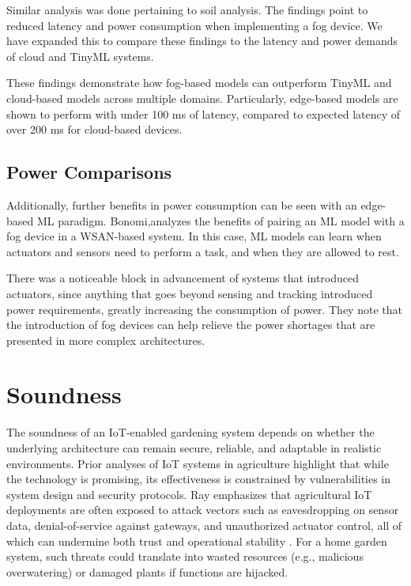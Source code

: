 \documentclass{sigchi}
\begin{document}
Similar analysis was done pertaining to soil analysis. The findings point to reduced latency and power consumption when implementing a fog device. We have expanded this to compare these findings to the latency and power demands of cloud and TinyML systems.

These findings demonstrate how fog-based models can outperform TinyML and cloud-based models across multiple domains. Particularly, edge-based models are shown to perform with under 100 ms of latency, compared to expected latency of over 200 ms for cloud-based devices.

\subsection{Power Comparisons}

Additionally, further benefits in power consumption can be seen with an edge-based ML paradigm. Bonomi\cite{bonomi2012fog},analyzes the benefits of pairing an ML model with a fog device in a WSAN-based system. In this case, ML models can learn when actuators and sensors need to perform a task, and when they are allowed to rest.

There was a noticeable block in advancement of systems that introduced actuators, since anything that goes beyond sensing and tracking introduced power requirements, greatly increasing the consumption of power. They note that the introduction of fog devices can help relieve the power shortages that are presented in more complex architectures.

\section{Soundness}

The soundness of an IoT-enabled gardening system depends on whether the underlying architecture can remain secure, reliable, and adaptable in realistic environments. Prior analyses of IoT systems in agriculture highlight that while the technology is promising, its effectiveness is constrained by vulnerabilities in system design and security protocols. Ray emphasizes that agricultural IoT deployments are often exposed to attack vectors such as eavesdropping on sensor data, denial-of-service against gateways, and unauthorized actuator control, all of which can undermine both trust and operational stability \cite{ray2020security}. For a home garden system, such threats could translate into wasted resources (e.g., malicious overwatering) or damaged plants if functions are hijacked.
\end{document}
